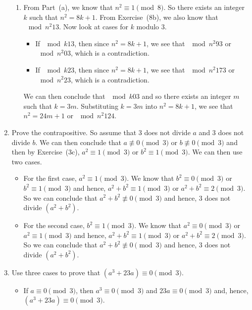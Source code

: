 \begin{enumerate}
\begin{enumerate}
\item From Part~(a), we know that $n^2 \equiv 1 \pmod 8$.  So there exists an integer $k$ such that $n^2 = 8k + 1$.  From Exercise~(8b), we also know that $\mod{n^2}{1}{3}$.  Now look at cases for $k$ modulo 3.

\begin{itemize}
  \item If $\mod{k}{1}{3}$, then since $n^2 = 8k + 1$, we see that $\mod{n^2}{9}{3}$ or $\mod{n^2}{0}{3}$, which is a contradiction.
  \item If $\mod{k}{2}{3}$, then since $n^2 = 8k + 1$, we see that $\mod{n^2}{17}{3}$ or $\mod{n^2}{2}{3}$, which is a contradiction.
\end{itemize}
We can then conclude that $\mod{k}{0}{3}$ and so there exists an integer $m$ such that $k = 3m$.  Substituting $k = 3m$ into $n^2 = 8k + 1$, we see that $n^2 = 24m + 1$ or $\mod{n^2}{1}{24}$.
\end{enumerate}


\item Prove the contrapositive.  So assume that 3 does not divide $a$ and 3 does not divide 
$b$.  We can then conclude that $a \not\equiv 0 \pmod 3$ or $b \not\equiv 0 \pmod 3$ and then by Exercise~(3c), $a^2 \equiv 1 \pmod 3$ or $b^2 \equiv 1 \pmod 3$.  We can then use two cases.
\begin{itemize}
\item For the first case, $a^2 \equiv 1 \pmod 3$.  We know that $b^2 \equiv 0 \pmod 3$ or 
$b^2 \equiv 1 \pmod 3$ and hence,  $a^2 + b^2 \equiv 1 \pmod 3$ or 
$a^2 + b^2 \equiv 2 \pmod 3$.  So we can conclude that $a^2 + b^2 \not\equiv 0 \pmod 3$ and hence, 3 does not divide $(a^2 + b^2)$.

\item For the second case, $b^2 \equiv 1 \pmod 3$.  We know that $a^2 \equiv 0 \pmod 3$ or 
$a^2 \equiv 1 \pmod 3$ and hence,  $a^2 + b^2 \equiv 1 \pmod 3$ or 
$a^2 + b^2 \equiv 2 \pmod 3$.  So we can conclude that $a^2 + b^2 \not\equiv 0 \pmod 3$ and hence, 3 does not divide $(a^2 + b^2)$.
\end{itemize}


\item Use three cases to prove that $\left(a^3 + 23a \right) \equiv 0 \pmod 3$.
\begin{itemize}
\item If $a \equiv 0 \pmod 3$, then $a^3 \equiv 0 \pmod 3$ and 
$23a \equiv 0 \pmod 3$ and, hence, $\left(a^3 + 23a \right) \equiv 0 \pmod 3$.


\end{itemize}
\end{enumerate}
